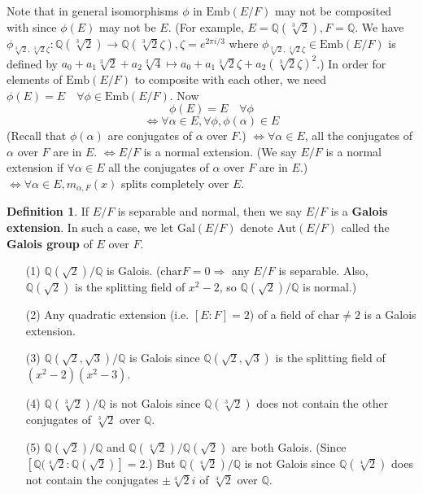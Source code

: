 \documentclass[12pt]{article}
\theoremstyle{definition}
\newtheorem{dfn}{Definition}
\newcommand{\QQ}{\mathbb Q}
\begin{document}
Note that in general isomorphisms $\phi$ in $\text{Emb}(E/F)$ may not be composited with since $\phi(E)$ may not be $E$.
(For example, $E = \mathbb{Q}(\sqrt[3]{2}), F = \mathbb{Q}$.
We have $\phi_{\sqrt[3]{2}, \sqrt[3]{2} \zeta}: \mathbb{Q}(\sqrt[3]{2}) \to \mathbb{Q}(\sqrt[3]{2} \zeta), \zeta = e^{2 \pi i/3}$ where $\phi_{\sqrt[3]{2}, \sqrt[3]{2} \zeta} \in \text{Emb}(E/F)$ is defined by $a_0 + a_1 \sqrt[3]{2} + a_2 \sqrt[3]{4} \mapsto a_0 + a_1 \sqrt[3]{2} \zeta + a_2 (\sqrt[3]{2} \zeta)^2$.)
In order for elements of $\text{Emb}(E/F)$ to composite with each other, we need $\phi(E) = E \quad \forall \phi \in \text{Emb}(E/F)$.
Now
\[
	\phi(E) = E \quad \forall \phi
\]
\[
	\Leftrightarrow \forall \alpha \in E, \forall \phi, \phi(\alpha) \in E
\]
(Recall that $\phi(\alpha)$ are conjugates of $\alpha$ over $F$.)
$\Leftrightarrow \forall \alpha \in E$, all the conjugates of $\alpha$ over $F$ are in $E$.
$\Leftrightarrow E/F$ is a normal extension.
(We say $E/F$ is a normal extension if $\forall \alpha \in E$ all the conjugates of $\alpha$ over $F$ are in $E$.)
$\Leftrightarrow \forall \alpha \in E, m_{\alpha, F}(x)$ splits completely over $E$.

\begin{dfn}
	If $E/F$ is separable and normal, then we say $E/F$ is a \textbf{Galois extension}.
	In such a case, we let $\text{Gal}(E/F)$ denote $\text{Aut}(E/F)$ called the \textbf{Galois group} of $E$ over $F$.
\end{dfn}

\begin{ex}
	\begin{enumerate}
		\item[(1)] $\QQ(\sqrt{2})/\QQ$ is Galois.
			($\text{char} F = 0 \Rightarrow $ any $E/F$ is separable.
			Also, $\QQ(\sqrt{2})$ is the splitting field of $x^2 - 2$, so $\QQ(\sqrt{2})/\QQ$ is normal.)

		\item[(2)] Any quadratic extension (i.e. $[E:F] = 2$) of a field of $\text{char} \neq 2$ is a Galois extension.

		\item[(3)] $\QQ(\sqrt{2}, \sqrt{3})/\QQ$ is Galois since $\QQ(\sqrt{2}, \sqrt{3})$ is the splitting field of $(x^2 - 2)(x^2 - 3)$.

		\item[(4)] $\QQ(\sqrt[3]{2})/\QQ$ is not Galois since $\QQ(\sqrt[3]{2})$ does not contain the other conjugates of $\sqrt[3]{2}$ over $\QQ$.

		\item[(5)] $\QQ(\sqrt{2})/\QQ$ and $\QQ(\sqrt[4]{2})/\QQ(\sqrt{2})$ are both Galois.
			(Since $[\QQ(\sqrt[4]{2}:\QQ(\sqrt{2})] = 2$.)
				But $\QQ(\sqrt[4]{2})/\QQ$ is not Galois since $\QQ(\sqrt[4]{2})$ does not contain the conjugates $\pm \sqrt[4]{2} i$ of $\sqrt[4]{2}$ over $\QQ$.
	\end{enumerate}
\end{ex}
\end{document}
